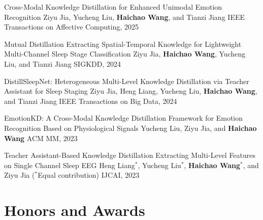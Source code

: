 \documentclass[11pt]{article}
\begin{document}
\pubentry
    {Cross-Modal Knowledge Distillation for Enhanced Unimodal Emotion Recognition}
    {Ziyu Jia, Yucheng Liu, \textbf{Haichao Wang}, and Tianzi Jiang}
    {IEEE Transactions on Affective Computing, 2025}

\pubentry
    {Mutual Distillation Extracting Spatial-Temporal Knowledge for Lightweight Multi-Channel Sleep Stage Classification}
    {Ziyu Jia, \textbf{Haichao Wang}, Yucheng Liu, and Tianzi Jiang}
    {SIGKDD, 2024}

\pubentry
    {DistillSleepNet: Heterogeneous Multi-Level Knowledge Distillation via Teacher Assistant for Sleep Staging}
    {Ziyu Jia, Heng Liang, Yucheng Liu, \textbf{Haichao Wang}, and Tianzi Jiang}
    {IEEE Transactions on Big Data, 2024}

\pubentry
    {EmotionKD: A Cross-Modal Knowledge Distillation Framework for Emotion Recognition Based on Physiological Signals}
    {Yucheng Liu, Ziyu Jia, and \textbf{Haichao Wang}}
    {ACM MM, 2023}

\pubentry
    {Teacher Assistant-Based Knowledge Distillation Extracting Multi-Level Features on Single Channel Sleep EEG}
    {Heng Liang$^*$, Yucheng Liu$^*$, \textbf{Haichao Wang}$^*$, and Ziyu Jia {\small ($^*$Equal contribution)}}
    {IJCAI, 2023}

\section{Honors and Awards}


\end{document}

